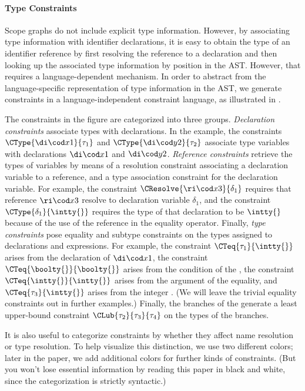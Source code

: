 \paragraph{Type Constraints}

Scope graphs do not include explicit type information. 
However, by associating type information with identifier declarations, it is
easy to obtain the type of an identifier reference by first resolving the
reference to a declaration and then looking up the associated type information
by position in the AST.
However, that requires a language-dependent mechanism. 
In order to abstract from the language-specific representation of type
information in the AST, we generate constraints in a language-independent
constraint language, as illustrated in .

The constraints in the figure are categorized into three groups.
\emph{Declaration constraints} associate types with declarations. In the
example, the constraints $\CType{\dic{x}{1}}{\tau_{1}}$ and
$\CType{\dic{y}{2}}{\tau_{2}}$ associate type variables with declarations
$\dic{x}{1}$ and $\dic{y}{2}$.
\emph{Reference constraints}
retrieve the types of variables by means of a
resolution constraint associating a declaration variable to a reference, and a
type association constraint for the declaration variable.
For example, the constraint $\CResolve{\ric{x}{3}}{\delta_{1}}$ requires that
reference $\ric{x}{3}$ resolve to declaration variable $\delta_{1}$, and the constraint
$\CType{\delta_{1}}{\intty{}}$ requires the type of that declaration to be
$\intty{}$ because of the use of the reference in the equality operator.
Finally, \emph{type constraints} pose equality and subtype constraints on the
types assigned to declarations and expressions.
For example, the constraint $\CTeq{\tau_{1}}{\intty{}}$ arises from the
declaration of $\dic{x}{1}$, the constraint $\CTeq{\boolty{}}{\boolty{}}$ arises
from the condition of the , the constraint $\CTeq{\intty{}}{\intty{}}$
arises from the  argument of the equality, and
$\CTeq{\tau_{3}}{\intty{}}$ arises from the integer . (We will leave the
trivial equality constraints out in further examples.) Finally, the branches of
the  generate a least upper-bound constraint
$\CLub{\tau_{2}}{\tau_{3}}{\tau_{4}}$ on the types of the branches.

It is also useful to categorize constraints by whether they affect name
resolution or type resolution. To help visualize this distinction, we use
two different colors; later in the paper, we add additional
colors for further kinds of constraints. (But you won't lose essential
information by reading this paper in black and white, since 
the categorization is strictly syntactic.)

